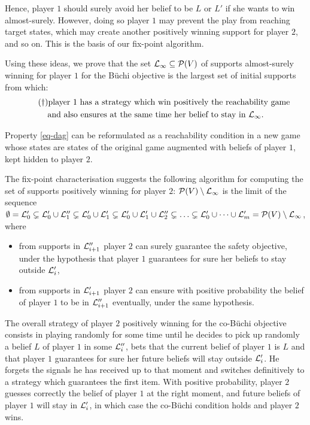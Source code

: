Hence, player $1$ should surely avoid her belief to be $L$
or $L'$ if she wants to win almost-surely.
However, doing so player $1$ may prevent the play from
reaching target states, which may create another positively winning
support for player $2$, and so on. This is the basis of our fix-point algorithm.

Using these ideas, we prove that the set
$\mathcal{L}_\infty\subseteq \mathcal{P}(V)$ of supports almost-surely
winning for player $1$ for the B{\"u}chi objective is the largest set of
initial supports from which:
\begin{multline}
\label{eq-dag}
\tag{$\dag$}
\textrm{player $1$ has a strategy
  which win positively the reachability game}\\
\textrm{and also ensures at the same time
  her belief to stay in } \mathcal{L}_\infty .
\end{multline}

Property \cref{eq-dag} can be reformulated as a reachability
condition in a new game whose states are states of the original game
augmented with beliefs of player $1$, kept hidden to player $2$.

The fix-point characterisation suggests the following algorithm for
computing the set of supports positively winning for player $2$:
$\mathcal{P}(V)\setminus\mathcal{L}_\infty$ is the limit of the sequence
$\emptyset=\mathcal{L}_0'\subsetneq \mathcal{L}_0'\cup \mathcal{L}_1''\subsetneq\mathcal{L}_0'\cup
\mathcal{L}_1'\subsetneq \mathcal{L}_0'\cup \mathcal{L}_1'\cup \mathcal{L}_2''\subsetneq\ldots
\subsetneq \mathcal{L}_0'\cup \cdots \cup \mathcal{L}'_m
=\mathcal{P}(V)\setminus\mathcal{L}_\infty$, where
\begin{itemize}
\item from supports in $\mathcal{L}''_{i+1}$ player $2$ can surely guarantee the safety objective,
under the hypothesis that player $1$ 
{guarantees for sure} her beliefs to stay outside $\mathcal{L}'_i$,
\item from supports in $\mathcal{L}'_{i+1}$ player $2$ can ensure with positive probability the belief of player $1$ to be in $\mathcal{L}''_{i+1}$ eventually,
under the same hypothesis.
\end{itemize}

The overall strategy of player $2$ positively winning for the co-B{\"u}chi objective
consists in playing randomly for some time until he decides to pick
up randomly a belief $L$ of player $1$ in some $\mathcal{L}''_i$,
bets that the current belief of player $1$ is $L$ and that player $1$
guarantees for sure
her future beliefs 
will stay outside $\mathcal{L}'_i$.
He forgets
the signals he has received up to that moment and switches
definitively to a strategy which guarantees the first item.  With positive
probability, player $2$ %
guesses correctly the belief of player $1$ at the right moment, and
future beliefs of player $1$ will stay in $\mathcal{L}'_i$, in which case the
co-B{\"u}chi condition holds and player $2$ wins.

